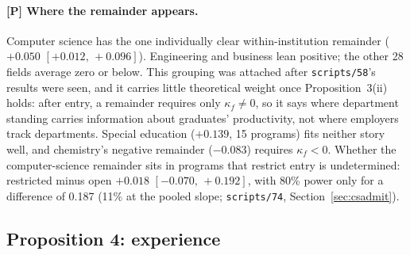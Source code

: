 \documentclass[11pt]{article}
\newcommand{\ci}[2]{$[#1,\allowbreak\,#2]$}
\begin{document}
\paragraph{[P] Where the remainder appears.} Computer science has the one individually clear within-institution
remainder ($+0.050$ \ci{+0.012}{+0.096}). Engineering and business lean positive; the other 28 fields average zero
or below. This grouping was attached after \texttt{scripts/58}'s results were seen, and it carries little
theoretical weight once Proposition~3(ii) holds: after entry, a remainder requires only $\kappa_f\neq0$, so it says
where department standing carries information about graduates' productivity, not where employers track
departments. Special education ($+0.139$, 15 programs) fits neither story well, and chemistry's negative remainder
($-0.083$) requires $\kappa_f<0$. Whether the computer-science remainder sits in programs that restrict entry is
undetermined: restricted minus open $+0.018$ \ci{-0.070}{+0.192}, with 80\% power only for a difference of 0.187
(11\% at the pooled slope; \texttt{scripts/74}, Section~\ref{sec:csadmit}).

\subsection{Proposition 4: experience}\label{si:theory:experience}
\end{document}
